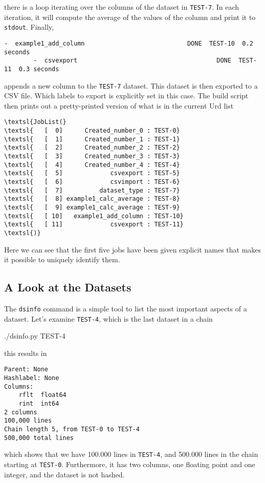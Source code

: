 \documentclass[a4paper]{article}
\begin{document}
\noindent there is a loop iterating over the columns of the dataset in
\texttt{TEST-7}.  In each iteration, it will compute the average of
the values of the column and print it to \texttt{stdout}.  Finally,
\begin{snugshade}
\begin{Verbatim}[commandchars=\\\{\}]
        -  example1_add_column                            DONE  TEST-10  0.2 seconds
        -  csvexport                                      DONE  TEST-11  0.3 seconds
\end{Verbatim}
\end{snugshade}
\noindent appends a new column to the \texttt{TEST-7} dataset.  This
dataset is then exported to a CSV file.  Which labels to export is
explicitly set in this case.  The build script then prints out a
pretty-printed version of what is in the current Urd list
\begin{snugshade}
\begin{Verbatim}[commandchars=\\\{\}]
\textsl{JobList(}
\textsl{   [  0]      Created_number_0 : TEST-0}
\textsl{   [  1]      Created_number_1 : TEST-1}
\textsl{   [  2]      Created_number_2 : TEST-2}
\textsl{   [  3]      Created_number_3 : TEST-3}
\textsl{   [  4]      Created_number_4 : TEST-4}
\textsl{   [  5]             csvexport : TEST-5}
\textsl{   [  6]             csvimport : TEST-6}
\textsl{   [  7]          dataset_type : TEST-7}
\textsl{   [  8] example1_calc_average : TEST-8}
\textsl{   [  9] example1_calc_average : TEST-9}
\textsl{   [ 10]   example1_add_column : TEST-10}
\textsl{   [ 11]             csvexport : TEST-11}
\textsl{)}
\end{Verbatim}
\end{snugshade}
\noindent Here we can see that the first five jobs have been given
explicit names that makes it possible to uniquely identify them.



\subsection*{A Look at the Datasets}
The \texttt{dsinfo} command is a simple tool to list the most
important aspects of a dataset.  Let's examine \texttt{TEST-4}, which
is the last dataset in a chain
\begin{shell2}
./dsinfo.py TEST-4
\end{shell2}
this results in
\begin{snugshade}
\begin{Verbatim}[commandchars=\\\{\}]
Parent: None
Hashlabel: None
Columns:
    rflt  float64
    rint  int64
2 columns
100,000 lines
Chain length 5, from TEST-0 to TEST-4
500,000 total lines
\end{Verbatim}
\end{snugshade}
\noindent which shows that we have 100.000 lines in \texttt{TEST-4}, and 500.000
lines in the chain starting at \texttt{TEST-0}.  Furthermore, it has
two columns, one floating point and one integer, and the dataset is
not hashed.
\end{document}
